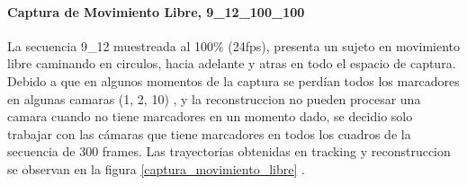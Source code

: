\paragraph{Captura de Movimiento Libre, 9\_12\_100\_100} 

La secuencia 9\_12 muestreada al 100\% (24fps), presenta un sujeto en movimiento libre caminando en circulos, hacia adelante y atras en todo el espacio de captura. Debido a que en algunos momentos de la captura se perdían todos los marcadores en algunas camaras (1, 2, 10) , y la reconstruccion no pueden procesar una camara cuando no tiene marcadores en un momento dado, se decidio solo trabajar con las cámaras que tiene marcadores en todos los cuadros de la secuencia de 300 frames. Las trayectorias obtenidas en tracking y reconstruccion se observan en la figura \ref{captura_movimiento_libre} .

